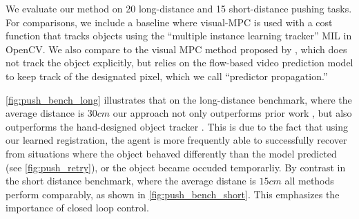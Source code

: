 We evaluate our method on 20 long-distance and 15 short-distance pushing tasks. For comparisons, we include a baseline where visual-MPC is used with a cost function that tracks objects using the ``multiple instance learning tracker'' MIL \cite{babenko2009visual} in OpenCV. 
We also compare to the visual MPC method proposed by \citet{sna},
which does not track the object explicitly, but relies on the flow-based video prediction model to keep track of the designated pixel, which we call ``predictor propagation.'' 

\autoref{fig:push_bench_long} illustrates that on the long-distance benchmark, where the average distance is $30cm$ our approach not only outperforms prior work \cite{sna}, but also outperforms the hand-designed object tracker \cite{babenko2009visual}. This is due to the fact that using our learned registration, the agent is more frequently able to successfully recover from situations where the object behaved differently than the model predicted (see \autoref{fig:push_retry}), or the object became occuded temporarliy. By contrast in the short distance benchmark, where the average distane is $15cm$  all methods perform comparably, as shown in \autoref{fig:push_bench_short}. This emphasizes the importance of closed loop control.


